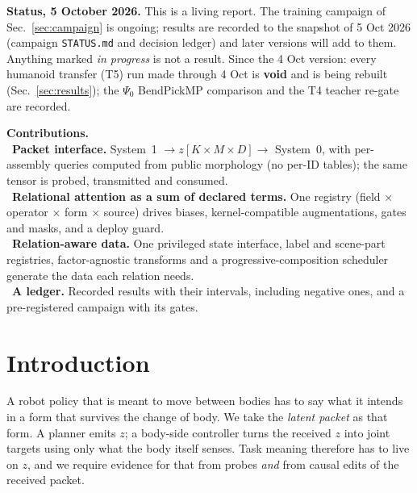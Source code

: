 \documentclass[10pt,twocolumn]{article}
\newcommand{\pt}[1]{\textcolor{rel}{\ding{\numexpr181+#1\relax}}}
\newcommand{\hl}[1]{\textcolor{rel!70!black}{\textbf{#1}}}
\begin{document}
\begin{tcolorbox}[colback=amber!10,colframe=amber!70!black,boxrule=0.5pt,arc=2pt,left=4pt,right=4pt,top=3pt,bottom=3pt]
\textbf{Status, 5 October 2026.} This is a living report. The training campaign of Sec.~\ref{sec:campaign} is ongoing; results are recorded to the snapshot of 5 Oct 2026 (campaign \texttt{STATUS.md} and decision ledger) and later versions will add to them. Anything marked \emph{in progress} is not a result. Since the 4 Oct version: every humanoid transfer (T5) run made through 4 Oct is \textbf{void} and is being rebuilt (Sec.~\ref{sec:results}); the $\Psi_0$ BendPickMP comparison and the T4 teacher re-gate are recorded.
\end{tcolorbox}

\begin{tcolorbox}[colback=rel!6,colframe=rel!40,boxrule=0.5pt,arc=2pt,left=4pt,right=4pt,top=3pt,bottom=3pt]
\textcolor{rel}{}\;\textbf{Contributions.}\\[1pt]
\pt{1}~\hl{Packet interface.} System~1 $\to z[K{\times}M{\times}D]\to$ System~0, with per-assembly queries computed from public morphology (no per-ID tables); the same tensor is probed, transmitted and consumed.\\
\pt{2}~\hl{Relational attention as a sum of declared terms.} One registry (field $\times$ operator $\times$ form $\times$ source) drives biases, kernel-compatible augmentations, gates and masks, and a deploy guard.\\
\pt{3}~\hl{Relation-aware data.} One privileged state interface, label and scene-part registries, factor-agnostic transforms and a progressive-composition scheduler generate the data each relation needs.\\
\pt{4}~\hl{A ledger.} Recorded results with their intervals, including negative ones, and a pre-registered campaign with its gates.
\end{tcolorbox}

\section{Introduction}
A robot policy that is meant to move between bodies has to say what it intends in a form that survives the change of body. We take the \emph{latent packet} as that form. A planner emits $z$; a body-side controller turns the received $z$ into joint targets using only what the body itself senses. Task meaning therefore has to live on $z$, and we require evidence for that from probes \emph{and} from causal edits of the received packet.
\end{document}
